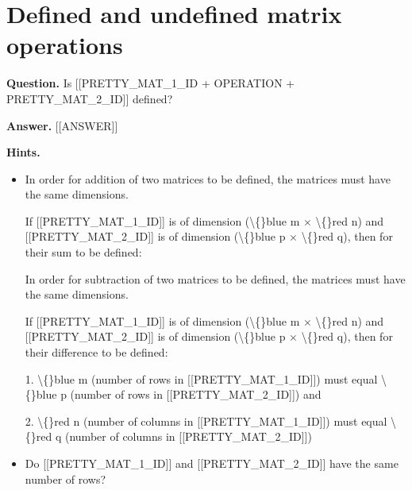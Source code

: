 \documentclass{article}
\begin{document}
\section*{Defined and undefined matrix operations}
\textbf{Question.} Is [[PRETTY\_MAT\_1\_ID + OPERATION + PRETTY\_MAT\_2\_ID]] defined?

\textbf{Answer.} [[ANSWER]]

\textbf{Hints.}
\begin{itemize}
  \item In order for addition of two matrices to be
                            defined, the matrices must have the same
                            dimensions.
                        
                        
                            If [[PRETTY\_MAT\_1\_ID]] is of
                            dimension (\textbackslash\{\}blue m $\times$ \textbackslash\{\}red n) and
                            [[PRETTY\_MAT\_2\_ID]] is of
                            dimension (\textbackslash\{\}blue p $\times$ \textbackslash\{\}red q),
                            then for their sum to be defined:
                        
                    
                        
                            In order for subtraction of two matrices to be
                            defined, the matrices must have the same
                            dimensions.
                        
                        
                            If [[PRETTY\_MAT\_1\_ID]] is of
                            dimension (\textbackslash\{\}blue m $\times$ \textbackslash\{\}red n) and
                            [[PRETTY\_MAT\_2\_ID]] is of
                            dimension (\textbackslash\{\}blue p $\times$ \textbackslash\{\}red q),
                            then for their difference to be defined:
                        
                    
                    
                        1. \textbackslash\{\}blue m (number of rows in [[PRETTY\_MAT\_1\_ID]]) must equal \textbackslash\{\}blue p (number of rows in [[PRETTY\_MAT\_2\_ID]]) and
                    
                    
                        2. \textbackslash\{\}red n (number of columns in [[PRETTY\_MAT\_1\_ID]]) must equal \textbackslash\{\}red q (number of columns in [[PRETTY\_MAT\_2\_ID]])
  \item Do [[PRETTY\_MAT\_1\_ID]] and [[PRETTY\_MAT\_2\_ID]] have the same number of rows?
                    

\end{itemize}
\end{document}
